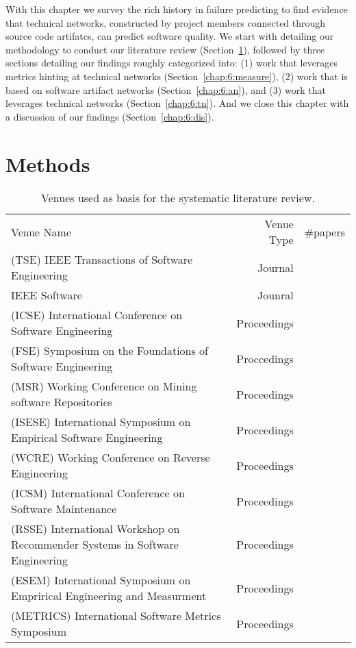 \label{chap:tech-net}
With this chapter we survey the rich history in failure predicting to find evidence that technical networks, constructed by project members connected through source code artifatcs, can predict software quality.
We start with detailing our methodology to conduct our literature review (Section~\ref{chap:6:methods}), followed by three sections detailing our findings roughly categorized into: 
(1) work that leverages metrics hinting at technical networks (Section~\ref{chap:6:measure}),
(2) work that is based on software artifact networks (Section~\ref{chap:6:an}),
and (3) work that leverages technical networks (Section~\ref{chap:6:tn}).
And we close this chapter with a discussion of our findings (Section~\ref{chap:6:dis}).

\section{Methods}
\label{chap:6:methods}
\begin{table}[t]
\centering
\begin{tabular}{lrr}
Venue Name & Venue Type & #papers \\
(TSE) IEEE Transactions of Software Engineering & Journal &\\
IEEE Software & Jounral & \\
(ICSE) International Conference on Software Engineering & Proceedings & \\
(FSE) Symposium on the Foundations of Software Engineering & Proccedings & \\
(MSR) Working Conference on Mining software Repositories & Proceedings & \\
(ISESE) International Symposium on Empirical Software Engineering & Proceedings & \\
(WCRE) Working Conference on Reverse Engineering & Proceedings & \\
(ICSM) International Conference on Software Maintenance & Proceedings & \\
(RSSE) International Workshop on Recommender Systems in Software Engineering & Proceedings & \\
(ESEM) International Symposium on Emprirical Engineering and Measurment & Proceedings & \\
(METRICS) International Software Metrics Symposium & Proceedings & \\
\end{tabular}
\label{chap:6:tab:venues}
\caption{Venues used as basis for the systematic literature review.}
\end{table}

